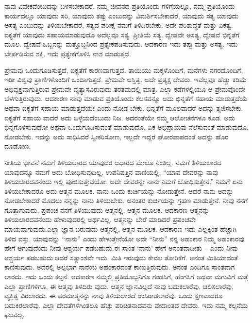 ನಾವು ವಿವೇಕವೆಂಬುದನ್ನು ಬಳಸಬೇಕಾದರೆ, ನಮ್ಮ ಜೀವನದ ಪ್ರತಿಯೊಂದು ಗಳಿಗೆಯಲ್ಲೂ, ನಮ್ಮ ಪ್ರತಿಯೊಂದು ಕಾರ್ಯದಲ್ಲೂ ಯಾವುದು ಸರಿ, ಯಾವುದು ತಪ್ಪು ಎಂಬುದನ್ನು ವಿಮರ್ಶಿಸಬೇಕಾದರೆ, ಯಾವುದು ಸತ್ಯ ಯಾವುದು ಅಸತ್ಯ ಎಂಬುದನ್ನು ತಿಳಿಯಬೇಕಾದರೆ, ಸತ್ಯದ ಪರೀಕ್ಷೆ ನಮಗೆ ತಿಳಿದಿರಬೇಕು. ಅದೇ ಪರಿಶುದ್ಧತೆ ಮತ್ತು ಏಕತ್ವ. ಐಕ್ಯತೆಗೆ ಯಾವುದು ಸಹಾಯಮಾಡುವುದೊ ಅದೆಲ್ಲವೂ ಸತ್ಯ. ಪ್ರೀತಿಯೆ ಸತ್ಯ. ದ್ವೇಷವೇ ಅಸತ್ಯ, ದ್ವೇಷವೆ ಭಿನ್ನತೆಗೆ ಮೂಲ. ದ್ವೇಷವೆ ಒಬ್ಬನನ್ನು ಮತ್ತೊಬ್ಬನಿಂದ ಪ್ರತ್ಯೇಕಪಡಿಸುವುದು. ಆದಕಾರಣ ಇದು ತಪ್ಪು ಮತ್ತು ಅಸತ್ಯ. ಇದು ಬೇರ್ಪಡಿಸುವ ಶಕ್ತಿ. ಇದು ಪ್ರತ್ಯೇಕಗೊಳಿಸಿ ನಾಶ ಮಾಡುತ್ತದೆ.

ಪ್ರೇಮವು ಒಂದುಗೂಡಿಸುತ್ತದೆ, ಐಕ್ಯತೆಗೆ ಕಾರಣವಾಗುತ್ತದೆ. ತಾಯಿಯು ಮಕ್ಕಳೊಂದಿಗೆ, ಮನೆಗಳು ನಗರದೊಂದಿಗೆ, ಇಡೀ ವಿಶ್ವವು ಪ್ರಾಣಿಗಳೊಂದಿಗೆ ಒಂದಾಗುತ್ತದೆ. ಪ್ರೇಮವೇ ಅಸ್ತಿತ್ವ. ಅದೇ ಪ್ರತ್ಯಕ್ಷ ದೇವರು. ಇವೆಲ್ಲವೂ ಹೆಚ್ಚು ಕಡಿಮೆ ಅಭಿವ್ಯಕ್ತವಾಗುತ್ತಿರುವ ಪ್ರೇಮವೇ ವ್ಯತ್ಯಾಸವಿರುವುದು ತರತಮದಲ್ಲಿ ಮಾತ್ರ. ಎಲ್ಲಾ ಕಡೆಗಳಲ್ಲಿಯೂ ಆ ಪ್ರೇಮವೊಂದೇ ಬೆಳಗುತ್ತಿರುವುದು. ಆದಕಾರಣ ನಾವು ಮಾಡುವ ಪ್ರತಿಯೊಂದು ಕೆಲಸವನ್ನೂ ಅದು ಭಿನ್ನತೆಗೆ ಸಹಾಯ ಮಾಡುತ್ತದೆಯೆ ಅಥವಾ ಐಕ್ಯತೆಗೆ ಸಹಾಯ ಮಾಡುತ್ತದೆಯೇ ಎಂದು ನೋಡ ಬೇಕು. ಭಿನ್ನತೆಗೆ ಮೂಲವಾದರೆ ಅದನ್ನು ತ್ಯಜಿಸಬೇಕು. ಐಕ್ಯತೆಗೆ ಸಹಾಯ ವಾದರೆ ಅದು ಒಳ್ಳೆಯದೆಂಬುದು ನಿಜ. ಅದರಂತೆಯೇ ನಮ್ಮ ಆಲೋಚನೆಗಳೂ ಕೂಡ. ಅದು ಭಿನ್ನಗೊಳಿಸುವುದೋ ಅಥವಾ ಒಂದುಗೂಡಿಸುವಂತೆ ಮಾಡುವುದೊ, ಏಕ ಅಭಿಪ್ರಾಯವು ನೆಲೆಸುವಂತೆ ಮಾಡುವುದೊ, ನೋಡಬೇಕು. ಇದನ್ನು ಅದು ಸಾಧಿಸಿದರೆ ಸ್ವೀಕರಿಸೋಣ, ಇಲ್ಲದೇ ಇದ್ದರೆ ಘೋರಪಾಪದಂತೆ ಅದನ್ನು ಹೊರ ದೂಡೋಣ.

ನೀತಿಯ ಭಾವನೆ ನಮಗೆ ತಿಳಿಯಲಾರದ ಯಾವುದರ ಆಧಾರದ ಮೇಲೂ ನಿಂತಿಲ್ಲ. ನಮಗೆ ತಿಳಿಯಲಾರದ ಯಾವುದನ್ನೂ ನಮಗೆ ಅದು ಬೋಧಿಸುವುದಿಲ್ಲ. ಉಪನಿಷತ್ತಿನ ವಾಣಿಯಲ್ಲಿ, “ಯಾವ ದೇವರನ್ನು ನಾವು ತಿಳಿಯಲಾರದವನೆಂದು ಇಲ್ಲಿ ಪೂಜಿಸುತ್ತೇವೆಯೋ, ಅದೇ ದೇವರನ್ನೇ ನಾನು ನಿಮಗೆ ಬೋಧಿಸುತ್ತೇನೆ.” ನಿಮಗೆ ಏನು ತಿಳಿಯಬೇಕಾದರೂ ಅದು ಆತ್ಮನ ಮೂಲಕ. ನಾನು ಒಂದು ಕುರ್ಚಿಯನ್ನು ನೋಡುತ್ತೇನೆ. ಆದರೆ ನಾನು ಅದನ್ನು ನೋಡಬೇಕಾದರೆ ಮೊದಲು ನನ್ನನ್ನು ನಾನು ತಿಳಿಯಬೇಕು. ಅನಂತರ ಕುರ್ಚಿಯನ್ನು ಗ್ರಹಣ ಮಾಡುತ್ತೇನೆ. ನೀವು ನನಗೆ ಗೊತ್ತಾಗುವುದು, ಪ್ರಪಂಚ ನನಗೆ ತಿಳಿಯುವುದು ಆತ್ಮನಲ್ಲಿ, ಆತ್ಮನ ಮೂಲಕ. ಆದಕಾರಣ ಆತ್ಮನನ್ನು ತಿಳಿಯಲಾರದವನೆಂದು ಹೇಳುವುದರಲ್ಲಿ ಅರ್ಥವಿಲ್ಲ. ಆತ್ಮನನ್ನು ಬೇರೆ ಮಾಡಿದರೆ ಪ್ರಪಂಚವೇ ಮಾಯವಾಗುವುದು.ಎಲ್ಲಾ ಜ್ಞಾನ ಬರುವುದು ಆತ್ಮನಲ್ಲಿ, ಆತ್ಮನ ಮೂಲಕ. ಆದಕಾರಣ ಇದು ಎಲ್ಲಕ್ಕಿಂತ ಹೆಚ್ಚಾಗಿ ತಿಳಿದ ವಸ್ತು. ಯಾವುದನ್ನು “ನಾನು” ಎಂದು ಹೇಳುತ್ತೇನೆಯೋ ಅದೇ “ನೀನು” ನನ್ನ ಅಹಂಕಾರ ನಿಮ್ಮ ಅಹಂಕಾರವು ಹೇಗೆ ಆಗುವುದೆಂದು ನೀವು ಆಶ್ಚರ್ಯ ಪಡಬಹುದು.ಈ ಸಾಂತ ‘ನಾನು’ ಹೇಗೆ ಅನಂತವಾದೀತು – ಎಂದು ನೀವು ಆಶ್ಚರ್ಯ ಪಡಬಹುದು.ಆದರೆ ಸತ್ಯಾಂಶವೇ ಇದು. ಮಿತಿ ಇರುವುದು ಕೇವಲ ತೋರಿಕೆಗೆ. ಅನಂತ ಮಿತಿಯಾದಂತೆ ಕಾಣಿಸುವುದು. ಅದರಲ್ಲಿ ಅಲ್ಪಭಾಗ ನಾನೆಂಬ ಅಹಂಕಾರದಂತೆ ಕಾಣುತ್ತಿರುವುದು. ಅನಂತ ಎಂದಿಗೂ ಸಾಂತವಾಗ ಲಾರದು. ಇದು ಒಂದು ಕಲ್ಪನೆ. ಆದಕಾರಣ ನಮ್ಮಲ್ಲಿ ಪ್ರತಿಯೊಬ್ಬನಿಗೂ ಗಂಡಸಿಗೆ, ಹೆಂಗಸಿಗೆ ಅಥವಾ ಮಗುವಿಗೆ ಮತ್ತೆ ಎಲ್ಲಾ ಪ್ರಾಣಿಗಳಿಗೂ, ಈ ಆತ್ಮವು ತಿಳಿದಿರು ವುದು. ಆತ್ಮನ ಜ್ಞಾನವಿಲ್ಲದೆ ನಾವು ಬದುಕಲಾರೆವು, ಚಲಿಸಲಾರೆವು, ವ್ಯಕ್ತಿತ್ವ ವಿರಲಾರದು. ಈ ಪರಮಾತ್ಮನನ್ನು ನಾವು ತಿಳಿಯಲಾರದೆ ಉಸಿರಾಡಲಾರೆವು. ಒಂದು ಕ್ಷಣವಾದರೂ ಬದುಕಿರಲಾರೆವು. ಎಲ್ಲಾ ದೇವತೆಗಳಿಗಿಂತಲೂ ಹೆಚ್ಚು ಪರಿಚಿತನಾದವನು ವೇದಾಂತದ ದೇವರು. ಇದು ನಮ್ಮ ಕಲ್ಪನೆಯ ಫಲವಲ್ಲ.

